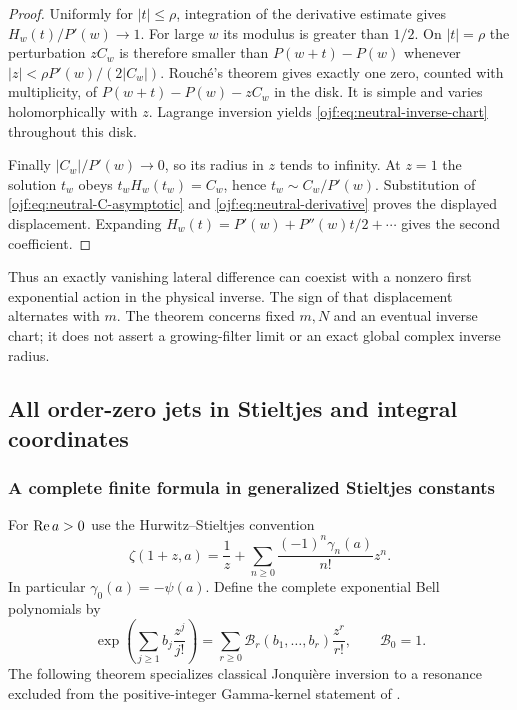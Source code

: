 \begin{proof}
Uniformly for $|t|\le\rho$, integration of the derivative estimate
gives $H_w(t)/P'(w)\to1$. For large $w$ its modulus is greater than
$1/2$. On $|t|=\rho$ the perturbation $zC_w$ is therefore smaller
than $P(w+t)-P(w)$ whenever $|z|<\rho P'(w)/(2|C_w|)$.
Rouch\'e's theorem gives exactly one zero, counted with multiplicity,
of $P(w+t)-P(w)-zC_w$ in the disk. It is simple and varies
holomorphically with $z$. Lagrange inversion yields
\eqref{ojf:eq:neutral-inverse-chart} throughout this disk.

Finally $|C_w|/P'(w)\to0$, so its radius in $z$ tends to infinity.
At $z=1$ the solution $t_w$ obeys
$t_wH_w(t_w)=C_w$, hence
$t_w\sim C_w/P'(w)$. Substitution of
\eqref{ojf:eq:neutral-C-asymptotic} and
\eqref{ojf:eq:neutral-derivative} proves the displayed displacement.
Expanding $H_w(t)=P'(w)+P''(w)t/2+\cdots$ gives the second coefficient.
\end{proof}

Thus an exactly vanishing lateral difference can coexist with a nonzero
first exponential action in the physical inverse. The sign of that
displacement alternates with $m$. The theorem concerns fixed $m,N$ and
an eventual inverse chart; it does not assert a growing-filter limit or
an exact global complex inverse radius.


\subsection{All order-zero jets in Stieltjes and integral coordinates}
\label{ojf:sec:stieltjes}

\subsubsection{A complete finite formula in generalized Stieltjes constants}
For $\operatorname{Re} a>0$ use the Hurwitz--Stieltjes convention \cite{intdist:DLMFHurwitz}
\begin{equation}\label{ojf:eq:stieltjes}
 \zeta(1+z,a)=\frac1z+
       \sum_{n\ge0}\frac{(-1)^n\gamma_n(a)}{n!}z^n.
\end{equation}
In particular $\gamma_0(a)=-\psi(a)$.
Define the complete exponential Bell polynomials by
\begin{equation}\label{ojf:eq:bell}
 \exp\left(\sum_{j\ge1}b_j\frac{z^j}{j!}\right)
       =\sum_{r\ge0}\mathcal{B}_r(b_1,\ldots,b_r)\frac{z^r}{r!},
 \qquad\mathcal{B}_0=1.
\end{equation}
The following theorem specializes classical Jonqui\`ere inversion to a
resonance excluded from the positive-integer Gamma-kernel statement of
\cite{qfb:reports}.

